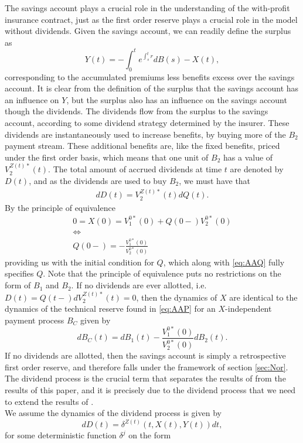 \documentclass[12pt]{article}
\theoremstyle{my_thm}
\begin{document}
The savings account plays a crucial role in the understanding of the with-profit insurance contract, just as the first order reserve plays a crucial role in the model without dividends. Given the savings account, we can readily define the surplus as
$$
Y(t)= - \int_0^t e^{\int_s^t r} dB(s)-X(t),
$$
corresponding to the accumulated premiums less benefits excess over the savings account. It is clear from the definition of the surplus that the savings account has an influence on $Y$, but the surplus also has an influence on the savings account though the dividends. The dividends flow from the surplus to the savings account, according to some dividend strategy determined by the insurer. These dividends are instantaneously used to increase benefits, by buying more of the $B_2$ payment stream. These additional benefits are, like the fixed benefits, priced under the first order basis, which means that one unit of $B_2$ has a value of $V_2^{Z(t)*}(t)$. The total amount of accrued dividends at time $t$ are denoted by $D(t)$, and as the dividends are used to buy $B_2$, we must have that
\begin{align}
dD(t)=V_2^{Z(t)*}(t)dQ(t). \label{eq:AAQ}
\end{align}
By the principle of equivalence
\begin{gather*}
0=X(0)=V_1^{0*}(0)+Q(0-)V_2^{0*}(0)
\\
\Leftrightarrow
\\
Q(0-)=-\frac{V_1^{0*}(0)}{V_2^{0*}(0)}
\end{gather*}
providing us with the initial condition for $Q$, which along with \eqref{eq:AAQ} fully specifies $Q$. Note that the principle of equivalence puts no restrictions on the form of $B_1$ and $B_2$. If no dividends are ever allotted, i.e. $D(t)=Q(t-)dV_2^{Z(t)*}(t)=0$, then the dynamics of $X$ are identical to the dynamics of the technical reserve found in \eqref{eq:AAP} for an $X$-independent payment process $B_C$ given  by
$$
dB_C(t)=dB_1(t)-\frac{V_1^{0*}(0)}{V_2^{0*}(0)}dB_2(t).
$$
If no dividends are allotted, then the savings account is simply a retrospective first order reserve, and therefore falls under the framework of section \ref{sec:Nor}. The dividend process is the crucial term that separates the results of \citet{Norberg} from the results of this paper, and it is precisely due to the dividend process that we need to extend the results of \citet{Norberg}.
\\[12pt]
We assume the dynamics of the dividend process is given by
$$
dD(t)=\delta^{Z(t)}(t,X(t),Y(t)) dt,
$$
for some deterministic function $\delta^j$ on the form
\end{document}
